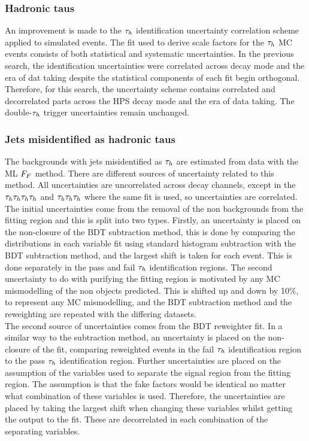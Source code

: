 \subsubsection{Hadronic taus}
An improvement is made to the $\tau_{h}$ identification uncertainty correlation scheme applied to simulated events.
The fit used to derive scale factors for the $\tau_{h}$ \ac{MC} events consists of both statistical and systematic uncertainties.
In the previous search, the identification uncertainties were correlated across decay mode and the era of dat taking despite the statistical components of each fit begin orthogonal.
Therefore, for this search, the uncertainty scheme contains correlated and decorrelated parts across the \ac{HPS} decay mode and the era of data taking.
The double-$\tau_{h}$ trigger uncertainties remain unchanged. \\

\subsubsection{Jets misidentified as hadronic taus}
The backgrounds with jets misidentified as $\tau_{h}$ are estimated from data with the \ac{ML} $F_{F}$ method. 
There are different sources of uncertainty related to this method. 
All uncertainties are uncorrelated across decay channels, except in the $\tau_{h}\tau_{h}\tau_{h}\tau_{h}$ and $\tau_{h}\tau_{h}\tau_{h}$ where the same fit is used, so uncertainties are correlated. \\

The initial uncertainties come from the removal of the non \jtth backgrounds from the fitting region and this is split into two types.
Firstly, an uncertainty is placed on the non-closure of the \ac{BDT} subtraction method, this is done by comparing the distributions in each variable fit using standard histogram subtraction with the \ac{BDT} subtraction method, and the largest shift is taken for each event. This is done separately in the pass and fail $\tau_{h}$ identification regions.
The second uncertainty to do with purifying the fitting region is motivated by any \ac{MC} mismodelling of the non \jtth objects predicted.
This is shifted up and down by 10\%, to represent any \ac{MC} mismodelling, and the \ac{BDT} subtraction method and the reweighting are repeated with the differing datasets. \\

The second source of uncertainties comes from the \ac{BDT} reweighter fit.
In a similar way to the subtraction method, an uncertainty is placed on the non-closure of the fit, comparing reweighted events in the fail $\tau_{h}$ identification region to the pass $\tau_{h}$ identification region.
Further uncertainties are placed on the assumption of the variables used to separate the signal region from the fitting region.
The assumption is that the fake factors would be identical no matter what combination of these variables is used.
Therefore, the uncertainties are placed by taking the largest shift when changing these variables whilst getting the output to the fit.
These are decorrelated in each combination of the separating variables.

